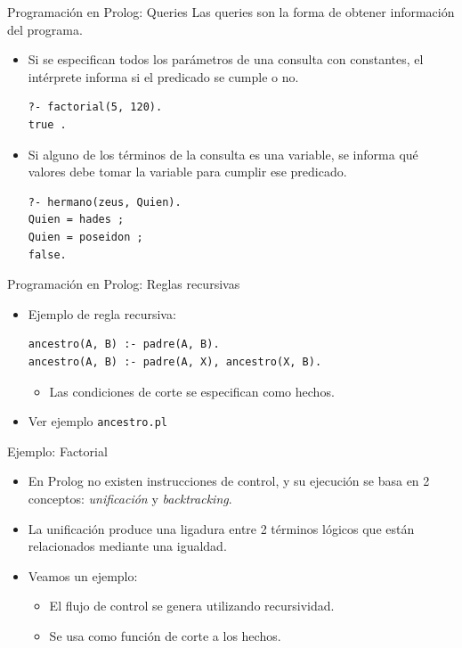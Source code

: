 \documentclass[xcolor=dvipsnames]{beamer}
\begin{document}
\begin{frame}[fragile]{Programación en Prolog: Queries}
    Las queries son la forma de obtener información del programa.
    \begin{itemize}
        \item Si se especifican todos los parámetros de una consulta con constantes, el intérprete informa si el predicado se cumple o no.
        \begin{lstlisting}
?- factorial(5, 120).
true .
        \end{lstlisting} 
        \item Si alguno de los términos de la consulta es una variable, se informa qué valores debe tomar la variable para cumplir ese predicado.
        \begin{lstlisting}
?- hermano(zeus, Quien).
Quien = hades ;
Quien = poseidon ;
false.
        \end{lstlisting} 
    \end{itemize}
\end{frame}

\begin{frame}[fragile]{Programación en Prolog: Reglas recursivas}
    \begin{itemize}
        \item Ejemplo de regla recursiva:
        \begin{lstlisting}
ancestro(A, B) :- padre(A, B).
ancestro(A, B) :- padre(A, X), ancestro(X, B).
        \end{lstlisting} 
        \begin{itemize}
            \item Las condiciones de corte se especifican como hechos.
        \end{itemize}
        \item Ver ejemplo \verb|ancestro.pl|
    \end{itemize}
\end{frame}

\begin{frame}[fragile]{Ejemplo: Factorial}
 
\begin{itemize}
 \item En Prolog no existen instrucciones de control, y su ejecución se basa en 2 conceptos: \textit{unificación} y \textit{backtracking}. 
 \item La unificación produce una ligadura entre 2 términos lógicos que están relacionados mediante una igualdad.
 \item Veamos un ejemplo:

\begin{itemize}
 \item El flujo de control se genera utilizando recursividad.
 \item Se usa como función de corte a los hechos. 
\end{itemize}
\end{itemize}

\end{frame}
 
\end{document}
